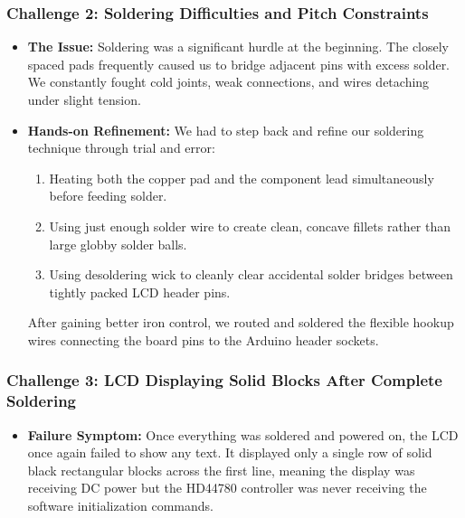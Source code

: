 \documentclass[journal,12pt,onecolumn]{IEEEtran}
\begin{document}
\begin{enumerate}
\subsubsection*{Challenge 2: Soldering Difficulties and Pitch Constraints}

\begin{itemize}
	\item \textbf{The Issue:} Soldering was a significant hurdle at the beginning. The closely spaced pads frequently caused us to bridge adjacent pins with excess solder. We constantly fought cold joints, weak connections, and wires detaching under slight tension.
	
	\item \textbf{Hands-on Refinement:} We had to step back and refine our soldering technique through trial and error:
	\begin{enumerate}
		\item Heating both the copper pad and the component lead simultaneously before feeding solder.
		\item Using just enough solder wire to create clean, concave fillets rather than large globby solder balls.
		\item Using desoldering wick to cleanly clear accidental solder bridges between tightly packed LCD header pins.
	\end{enumerate}
	After gaining better iron control, we routed and soldered the flexible hookup wires connecting the board pins to the Arduino header sockets.
\end{itemize}

\subsubsection*{Challenge 3: LCD Displaying Solid Blocks After Complete Soldering}

\begin{itemize}
	\item \textbf{Failure Symptom:} Once everything was soldered and powered on, the LCD once again failed to show any text. It displayed only a single row of solid black rectangular blocks across the first line, meaning the display was receiving DC power but the HD44780 controller was never receiving the software initialization commands.
	

\end{itemize}
\end{enumerate}
\end{document}
